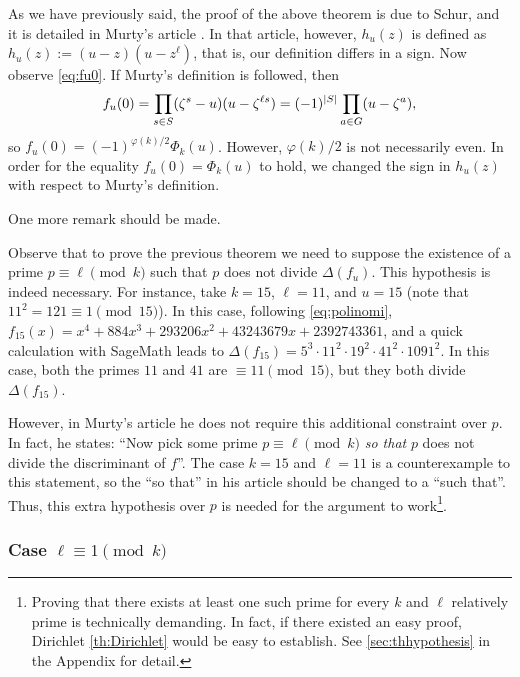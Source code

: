 \documentclass[../main.tex]{subfiles}
\begin{document}
\begin{remark}
	As we have previously said, the proof of the above theorem is due to Schur, and it is detailed in Murty's article \cite{Murty}. In that article, however, $h_u(z)$ is defined as $h_u(z):=(u-z)(u-z^\ell)$, that is, our definition differs in a sign. Now observe \cref{eq:fu0}. If Murty's definition is followed, then 
		\begin{equation*}
		f_u(0)=\prod_{s\in S}(\zeta^s-u)(u-\zeta^{\ell s})=(-1)^{\abs{S}}\prod_{a\in G}(u-\zeta^a),
	\end{equation*}
	so $f_u(0)=(-1)^{\varphi(k)/2}\Phi_k(u)$. However, $\varphi(k)/2$ is not necessarily even. In order for the equality $f_u(0)=\Phi_k(u)$ to hold, we changed the sign in $h_u(z)$ with respect to Murty's definition.
\end{remark}

One more remark should be made.
\begin{remark}
Observe that to prove the previous theorem we need to suppose the existence of a prime $p\equiv \ell \pmod{k}$ such that $p$ does not divide $\Delta(f_u)$. This hypothesis is indeed necessary. For instance, take $k=15$, $\ell=11$, and $u=15$ (note that $11^2=121\equiv 1 \pmod{15}$). In this case, following \cref{eq:polinomi}, $f_{15}(x)=x^4+884x^3+293206x^2+43243679x+2392743361$, and a quick calculation with SageMath leads to $\Delta(f_{15})=5^3\cdot11^2\cdot19^2\cdot41^2\cdot1091^2$. In this case, both the primes $11$ and $41$ are $\equiv 11\pmod{15}$, but they both divide $\Delta(f_{15})$. 

However, in Murty's article he does not require this additional constraint over $p$. In fact, he states: ``Now pick some prime $p\equiv \ell \pmod{k}$ \emph{so that} $p$ does not divide the discriminant of $f$''. The case $k=15$ and $\ell=11$ is a counterexample to this statement, so the ``so that'' in his article should be changed to a ``such that''. Thus, this extra hypothesis over $p$ is needed for the argument to work\footnote{Proving that there exists at least one such prime for every $k$ and $\ell$ relatively prime is technically demanding. In fact, if there existed an easy proof, Dirichlet \cref{th:Dirichlet} would be easy to establish. See \cref{sec:thhypothesis} in the Appendix for detail.}. 
\end{remark}
	
\subsubsection{Case \texorpdfstring{$\ell\equiv 1\pmod{k}$}{l=1 (mod k)}}\label{sec:Schur_l_cong1}
\end{document}
